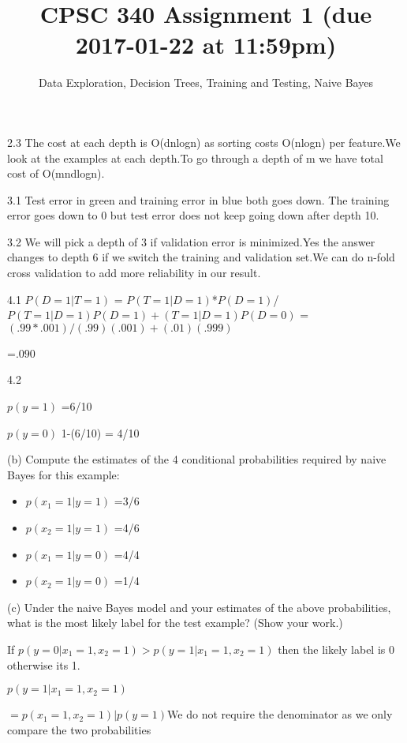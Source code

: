 \documentclass{article}
\def\blu#1{{\color{blu}#1}}
\def\gre#1{{\color{gre}#1}}
\def\red#1{{\color{red}#1}}
\def\items#1{\begin{itemize}#1\end{itemize}}
\begin{document}
\title{CPSC 340 Assignment 1 (due 2017-01-22 at 11:59pm)}
\author{Data Exploration, Decision Trees, Training and Testing, Naive Bayes}
\date{}
\maketitle







\gre{2.3 The cost at each depth is O(dnlogn) as sorting costs O(nlogn) per feature.We look at the examples at each depth.To go through a depth of m we have total cost of O(mndlogn).}




\gre{3.1 Test error in green and training error in blue both goes down. The training error goes down to 0 but test error does not keep going down after depth 10.}


\gre{3.2 We will pick a depth of 3 if validation error is minimized.Yes the answer changes to depth 6 if we switch the training and validation set.We can do n-fold cross validation to add more reliability in our result. }


\gre{4.1 $P(D=1|T=1)$ = $P(T=1|D=1)$*$P(D=1)$/$P(T=1|D=1)P(D=1) +(T=1|D=1)P(D=0)$}
\gre{=$(.99*.001)/(.99)(.001)+(.01)(.999)$}

\gre{=$.090$}

\gre{4.2}

\gre{$ p(y = 1)$ =\gre {6/10}}

\gre{ $p(y = 0)$ \gre {1-(6/10) = 4/10}}

\blu{(b) Compute the estimates of the 4 conditional probabilities required by naive Bayes for this example:}
\items{
\item $p(x_1 = 1 | y = 1)$ =\gre {3/6}
\item $p(x_2 = 1 | y = 1)$ =\gre {4/6}
\item $p(x_1 = 1 | y = 0)$ =\gre {4/4}
\item $p(x_2 = 1 | y = 0)$ =\gre {1/4}
}

\blu{(c) Under the naive Bayes model and your estimates of the above probabilities, what is the most likely label for the test example? (Show your work.)}

\gre {If $p(y = 0|x_1 = 1, x_2 = 1) > p(y = 1|x_1 = 1, x_2 = 1)$ then the likely label is 0 otherwise its 1.}

\gre{$p(y = 1|x_1 = 1, x_2 = 1)$}

\gre{$=p(x_1 = 1, x_2 = 1)|p(y=1)$}\red{We do not require the denominator as we only compare the two probabilities }
\end{document}
